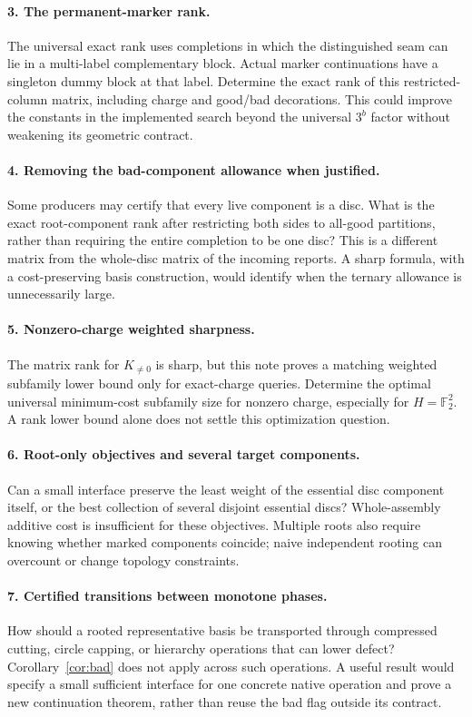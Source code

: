 \documentclass[11pt,letterpaper]{article}
\theoremstyle{definition}
\newcommand{\F}{\mathbb F}
\begin{document}
\paragraph{3. The permanent-marker rank.}
The universal exact rank uses completions in which the distinguished seam can lie in a multi-label complementary block. Actual marker continuations have a singleton dummy block at that label. Determine the exact rank of this restricted-column matrix, including charge and good/bad decorations. This could improve the constants in the implemented search beyond the universal $3^b$ factor without weakening its geometric contract.

\paragraph{4. Removing the bad-component allowance when justified.}
Some producers may certify that every live component is a disc. What is the exact root-component rank after restricting both sides to all-good partitions, rather than requiring the entire completion to be one disc? This is a different matrix from the whole-disc matrix of the incoming reports. A sharp formula, with a cost-preserving basis construction, would identify when the ternary allowance is unnecessarily large.

\paragraph{5. Nonzero-charge weighted sharpness.}
The matrix rank for $K_{\ne0}$ is sharp, but this note proves a matching weighted subfamily lower bound only for exact-charge queries. Determine the optimal universal minimum-cost subfamily size for nonzero charge, especially for $H=\F_2^2$. A rank lower bound alone does not settle this optimization question.

\paragraph{6. Root-only objectives and several target components.}
Can a small interface preserve the least weight of the essential disc component itself, or the best collection of several disjoint essential discs? Whole-assembly additive cost is insufficient for these objectives. Multiple roots also require knowing whether marked components coincide; naive independent rooting can overcount or change topology constraints.

\paragraph{7. Certified transitions between monotone phases.}
How should a rooted representative basis be transported through compressed cutting, circle capping, or hierarchy operations that can lower defect? Corollary~\ref{cor:bad} does not apply across such operations. A useful result would specify a small sufficient interface for one concrete native operation and prove a new continuation theorem, rather than reuse the bad flag outside its contract.
\end{document}

